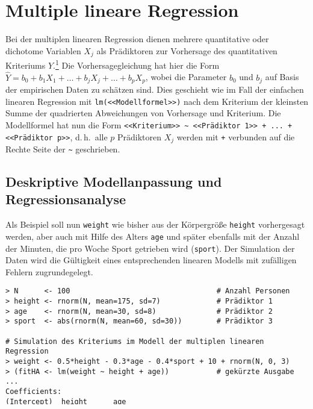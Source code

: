 \section{Multiple lineare Regression}
\label{sec:regrMult}

Bei der multiplen linearen Regression dienen mehrere quantitative oder dichotome Variablen $X_{j}$ als Prädiktoren zur Vorhersage des quantitativen Kriteriums $Y$.\footnote{Für die multivariate multiple Regression mit mehreren Kriteriumsvariablen $Y_{k}$ s.\ Abschn.\ \ref{sec:multRegrMult}. Eine formalere Behandlung des allgemeinen linearen Modells findet sich in Abschn.\ \ref{sec:multALM}.} Die Vorhersagegleichung hat hier die Form $\hat{Y} = b_{0} + b_{1} X_{1} + {\dots} + b_{j} X_{j} + {\dots} + b_{p} X_{p}$, wobei die Parameter $b_{0}$ und $b_{j}$ auf Basis der empirischen Daten zu schätzen sind. Dies geschieht wie im Fall der einfachen linearen Regression mit \lstinline!lm(<<Modellformel>>)! nach dem Kriterium der kleinsten Summe der quadrierten Abweichungen von Vorhersage und Kriterium. Die Modellformel hat nun die Form \lstinline!<<Kriterium>> ~ <<Prädiktor 1>> + ... + <<Prädiktor p>>!, d.\,h.\ alle $p$ Prädiktoren $X_{j}$ werden mit \lstinline!+! verbunden auf die Rechte Seite der \lstinline!~! geschrieben.

\subsection{Deskriptive Modellanpassung und Regressionsanalyse}
\label{sec:regrMultAn}

Als Beispiel soll nun \lstinline!weight! wie bisher aus der Körpergröße \lstinline!height! vorhergesagt werden, aber auch mit Hilfe des Alters \lstinline!age! und später ebenfalls mit der Anzahl der Minuten, die pro Woche Sport getrieben wird (\lstinline!sport!). Der Simulation der Daten wird die Gültigkeit eines entsprechenden linearen Modells mit zufälligen Fehlern zugrundegelegt.
\begin{lstlisting}
> N      <- 100                                  # Anzahl Personen
> height <- rnorm(N, mean=175, sd=7)             # Prädiktor 1
> age    <- rnorm(N, mean=30, sd=8)              # Prädiktor 2
> sport  <- abs(rnorm(N, mean=60, sd=30))        # Prädiktor 3

# Simulation des Kriteriums im Modell der multiplen linearen Regression
> weight <- 0.5*height - 0.3*age - 0.4*sport + 10 + rnorm(N, 0, 3)
> (fitHA <- lm(weight ~ height + age))           # gekürzte Ausgabe ...
Coefficients:
(Intercept)  height      age
   -72.5404  0.8602  -0.4429
\end{lstlisting}

